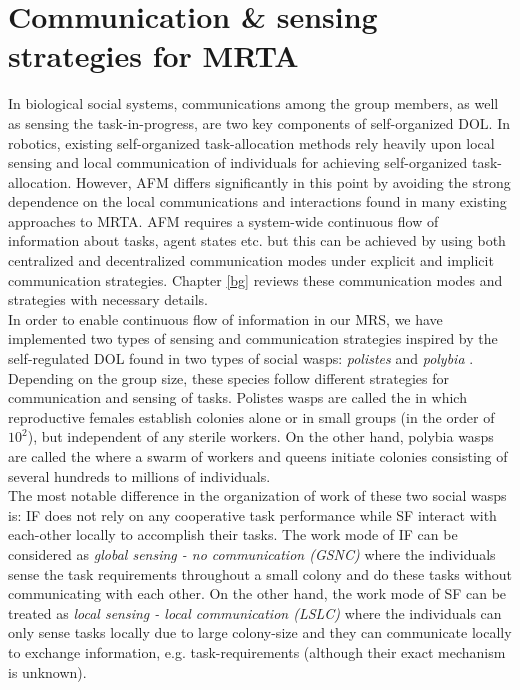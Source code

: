\section{Communication \& sensing strategies for MRTA}
\label{intro:comm}
In biological social systems, communications among the group members, as well as sensing the task-in-progress, are two key components of self-organized DOL. In robotics, existing self-organized task-allocation methods rely heavily upon local  sensing and local communication of individuals for achieving self-organized task-allocation. However,  AFM differs significantly in this point by avoiding the strong dependence on the local communications and interactions found in many existing approaches to MRTA. AFM requires a system-wide continuous flow of information about tasks, agent states etc. but this can be achieved by using both centralized and decentralized communication modes under explicit and implicit communication strategies. Chapter \ref{bg} reviews these communication modes and strategies with necessary details.\\
In order to enable continuous flow of information in our MRS, we have implemented two types of sensing and communication strategies inspired by the self-regulated DOL found in two types of social wasps: {\em polistes} and  {\em polybia} \cite{Jeanne1999}. Depending on the group size, these species follow different strategies for  communication and sensing of tasks.  Polistes wasps are called the  in which reproductive females establish colonies alone or in small groups (in the order of $10^2$), but independent of any sterile workers. On the other hand, polybia wasps are called the  where a swarm of workers and queens initiate colonies consisting of several hundreds to millions of individuals.\\
The most notable difference in the organization of work of these two social wasps is: IF does not rely on any cooperative task performance while SF interact with each-other locally to accomplish their tasks. The work mode of IF can be considered as {\em global sensing - no communication (GSNC)} where the individuals sense the task requirements throughout a small colony and do these tasks without communicating with each other. On the other hand, the work mode of SF can be treated as {\em local sensing - local communication (LSLC)} where the individuals can only sense tasks locally due to large colony-size and they can communicate locally to exchange information, e.g. task-requirements (although their exact mechanism is unknown).\\
